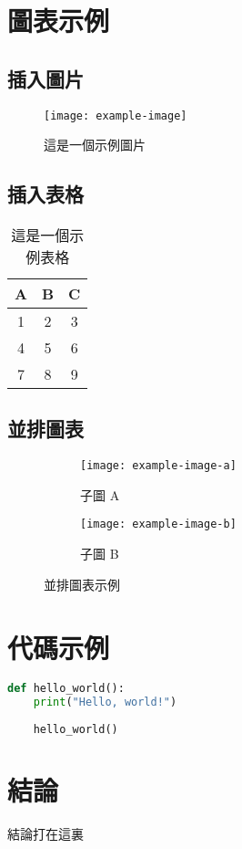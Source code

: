 \documentclass{article}
\begin{document}
\section{圖表示例}
	
\subsection{插入圖片}
\begin{figure}[h]
	\centering
	\texttt{[image: example-image]} %
	\caption{這是一個示例圖片}
	\label{fig:example}
\end{figure}
	
\subsection{插入表格}
\begin{table}[h]
	\centering
	\begin{tabular}{|c|c|c|}
		\hline
		A & B & C \\
		\hline
		1 & 2 & 3 \\
		4 & 5 & 6 \\
		7 & 8 & 9 \\
		\hline
	\end{tabular}
	\caption{這是一個示例表格}
	\label{tab:example}
\end{table}
	
\subsection{並排圖表}
\begin{figure}[h]
	\centering
	\begin{subfigure}{0.45\textwidth}
		\centering
		\texttt{[image: example-image-a]} %
		\caption{子圖 A}
	\end{subfigure}
	\hfill
	\begin{subfigure}{0.45\textwidth}
		\centering
		\texttt{[image: example-image-b]} %
		\caption{子圖 B}
	\end{subfigure}
	\caption{並排圖表示例}
	\label{fig:sidebyside}
\end{figure}
	
\section{代碼示例}
\begin{lstlisting}[language=Python, caption=Python 代碼示例]
	def hello_world():
	print("Hello, world!")
	
	hello_world()
\end{lstlisting}
	
\section{結論}
結論打在這裏
	
\end{document}
